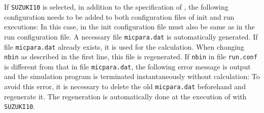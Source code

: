If \verb|SUZUKI10| is selected, in addition to the specification of , the following configuration needs to be added to both configuration files of init and run executions:
In this case,  in the init configuration file must also be same as in the run configuration file. A necessary file \verb|micpara.dat| is automatically generated. If file \verb|micpara.dat| already exists, it is used for the calculation. When changing \verb|nbin| as described in the first line, this file is regenerated. If \verb|nbin| in file \verb|run.conf| is different from that in file \verb|micpara.dat|, the following error message is output and the simulation program is terminated instantaneously without calculation:
To avoid this error, it is necessary to delete the old \verb|micpara.dat| beforehand and regenerate it. The regeneration is automatically done at the execution of \scalerm with \verb|SUZUKI10|.

